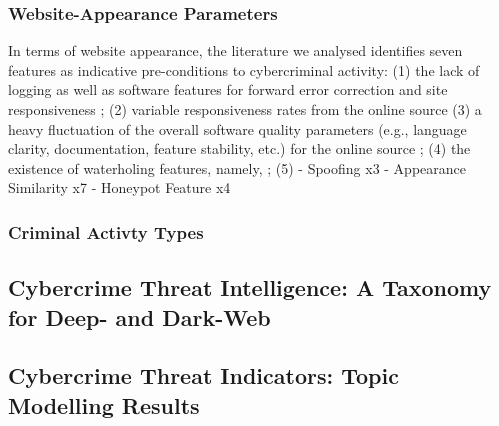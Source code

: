 \subsubsection{Website-Appearance Parameters}

In terms of website appearance, the literature we analysed identifies seven features as indicative pre-conditions to cybercriminal activity: (1) the lack of logging as well as software features for forward error correction and site responsiveness \cite{}; (2) variable responsiveness rates from the online source \cite{} (3) a heavy fluctuation of the overall software quality parameters (e.g., language clarity, documentation, feature stability, etc.) for the online source \cite{}; (4) the existence of waterholing features, namely, ; (5)
- Spoofing x3
- Appearance Similarity x7
- Honeypot Feature x4

\subsubsection{Criminal Activty Types}

\subsection{Cybercrime Threat Intelligence: A Taxonomy for Deep- and Dark-Web}











\subsection{Cybercrime Threat Indicators: Topic Modelling Results}

